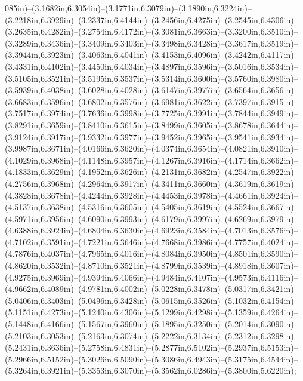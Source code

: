 085in)--(3.1682in,6.3054in)--(3.1771in,6.3079in)--(3.1890in,6.3224in)--(3.2218in,6.3929in)--(3.2337in,6.4144in)--(3.2456in,6.4275in)--(3.2545in,6.4306in)--(3.2635in,6.4282in)--(3.2754in,6.4172in)--(3.3081in,6.3663in)--(3.3200in,6.3510in)--(3.3289in,6.3436in)--(3.3409in,6.3403in)--(3.3498in,6.3428in)--(3.3617in,6.3519in)--(3.3944in,6.3923in)--(3.4063in,6.4041in)--(3.4153in,6.4096in)--(3.4242in,6.4117in)--(3.4331in,6.4102in)--(3.4450in,6.4034in)--(3.4897in,6.3596in)--(3.5016in,6.3534in)--(3.5105in,6.3521in)--(3.5195in,6.3537in)--(3.5314in,6.3600in)--(3.5760in,6.3980in)--(3.5939in,6.4038in)--(3.6028in,6.4028in)--(3.6147in,6.3977in)--(3.6564in,6.3656in)--(3.6683in,6.3596in)--(3.6802in,6.3576in)--(3.6981in,6.3622in)--(3.7397in,6.3915in)--(3.7517in,6.3974in)--(3.7636in,6.3998in)--(3.7725in,6.3991in)--(3.7844in,6.3949in)--(3.8291in,6.3659in)--(3.8410in,6.3615in)--(3.8499in,6.3605in)--(3.8678in,6.3644in)--(3.9124in,6.3917in)--(3.9332in,6.3977in)--(3.9452in,6.3965in)--(3.9541in,6.3934in)--(3.9987in,6.3671in)--(4.0166in,6.3620in)--(4.0374in,6.3654in)--(4.0821in,6.3910in)--(4.1029in,6.3968in)--(4.1148in,6.3957in)--(4.1267in,6.3916in)--(4.1714in,6.3662in)--(4.1833in,6.3629in)--(4.1952in,6.3626in)--(4.2131in,6.3682in)--(4.2547in,6.3922in)--(4.2756in,6.3968in)--(4.2964in,6.3917in)--(4.3411in,6.3660in)--(4.3619in,6.3619in)--(4.3828in,6.3678in)--(4.4244in,6.3928in)--(4.4453in,6.3978in)--(4.4661in,6.3924in)--(4.5137in,6.3638in)--(4.5316in,6.3605in)--(4.5405in,6.3619in)--(4.5524in,6.3667in)--(4.5971in,6.3956in)--(4.6090in,6.3993in)--(4.6179in,6.3997in)--(4.6269in,6.3979in)--(4.6388in,6.3924in)--(4.6804in,6.3630in)--(4.6923in,6.3584in)--(4.7013in,6.3576in)--(4.7102in,6.3591in)--(4.7221in,6.3646in)--(4.7668in,6.3986in)--(4.7757in,6.4024in)--(4.7876in,6.4037in)--(4.7965in,6.4016in)--(4.8084in,6.3950in)--(4.8501in,6.3590in)--(4.8620in,6.3532in)--(4.8710in,6.3521in)--(4.8799in,6.3539in)--(4.8918in,6.3607in)--(4.9275in,6.3969in)--(4.9394in,6.4066in)--(4.9484in,6.4107in)--(4.9573in,6.4116in)--(4.9662in,6.4089in)--(4.9781in,6.4002in)--(5.0228in,6.3478in)--(5.0317in,6.3421in)--(5.0406in,6.3403in)--(5.0496in,6.3428in)--(5.0615in,6.3526in)--(5.1032in,6.4154in)--(5.1151in,6.4273in)--(5.1240in,6.4306in)--(5.1299in,6.4298in)--(5.1359in,6.4264in)--(5.1448in,6.4166in)--(5.1567in,6.3960in)--(5.1895in,6.3250in)--(5.2014in,6.3090in)--(5.2103in,6.3053in)--(5.2163in,6.3074in)--(5.2222in,6.3134in)--(5.2312in,6.3298in)--(5.2431in,6.3636in)--(5.2758in,6.4831in)--(5.2877in,6.5102in)--(5.2937in,6.5153in)--(5.2966in,6.5152in)--(5.3026in,6.5090in)--(5.3086in,6.4943in)--(5.3175in,6.4544in)--(5.3264in,6.3921in)--(5.3353in,6.3070in)--(5.3562in,6.0286in)--(5.3800in,5.6220in);
